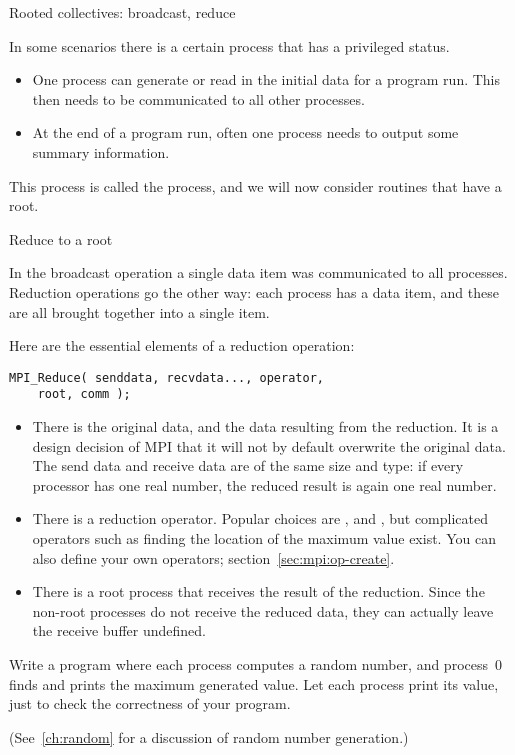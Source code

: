  {Rooted collectives: broadcast, reduce}
\label{sec:bcast}

In some scenarios there is a certain process that has a privileged status.
\begin{itemize}
\item
  One process can generate or read in the initial data for a program
  run. This then needs to be communicated to all other processes.
\item
  At the end of a program run, often
  one process needs to output some summary information.
\end{itemize}
This process is called the  process, and we will now
consider routines that have a root.

 {Reduce to a root}
\label{sec:reduce-root}

In the broadcast operation a single data item was communicated to all
processes. Reduction operations go the other way: each process has a
data item, and these are all brought together into a single item.

Here are the essential elements of a reduction operation:
\begin{verbatim}
MPI_Reduce( senddata, recvdata..., operator,
    root, comm ); 
\end{verbatim}
\begin{itemize}
\item There is the original data, and the data resulting from the
  reduction. It is a design decision of MPI that it will not by
  default overwrite the original data. The send data and receive data
  are of the same size and type: if every processor has one real
  number, the reduced result is again one real number.
\item There is a reduction operator. Popular choices are
  ,  and
  , but complicated operators such as finding
  the location of the maximum value exist. You can also define your
  own operators; section~\ref{sec:mpi:op-create}.
\item There is a root process that receives the result of the
  reduction. Since the non-root processes do not receive the reduced
  data, they can actually leave the receive buffer undefined.
\end{itemize}



\begin{exercise}
  \label{ex:randommax}
  Write a program where each process computes a random number, and process~0
  finds and prints the maximum generated value. Let each process print its value,
  just to check the correctness of your program.
\begin{book}
  (See~\ref{ch:random} for a discussion of random number generation.)
\end{book}
\end{exercise}

